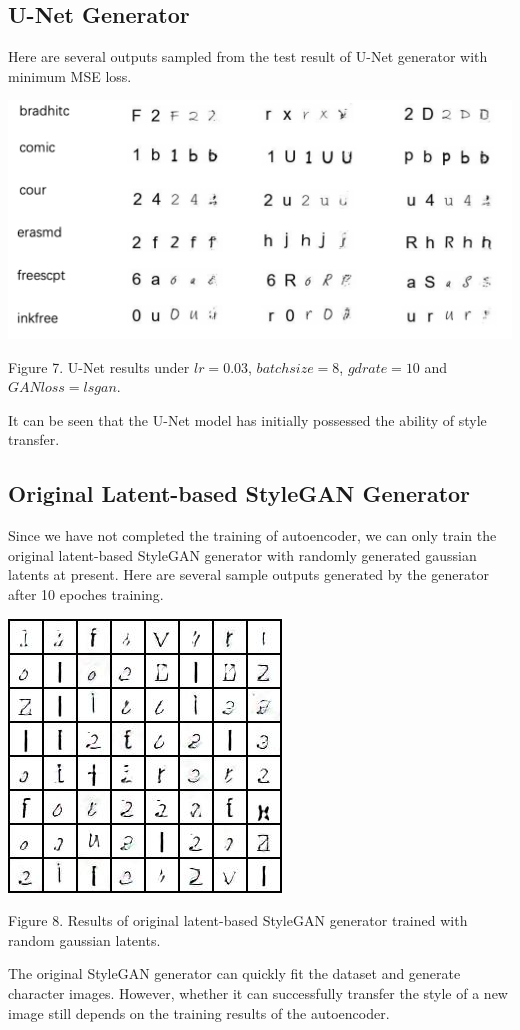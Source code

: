 \documentclass[letterpaper]{article}
\begin{document}
\subsection{U-Net Generator}
Here are several outputs sampled from the test result of U-Net generator with minimum MSE loss. 

\begin{center}
    \includegraphics[width=.5\textwidth]{./update-figs/lr_0.03_batchsize_8_g_d_rate_10_loss_lsgan.png}

    Figure 7. U-Net results under $lr=0.03$, $batchsize=8$, $gdrate=10$ and $GAN loss=lsgan$.
\end{center}

It can be seen that the U-Net model has initially possessed the ability of style transfer.

\subsection{Original Latent-based StyleGAN Generator}
Since we have not completed the training of autoencoder, we can only train the original latent-based StyleGAN generator with randomly generated gaussian latents at present. Here are several sample outputs generated by  the generator after 10 epoches training.

\begin{center}
    \includegraphics[width=.3\textwidth]{./update-figs/latentstylegan.jpg}

    Figure 8. Results of original latent-based StyleGAN generator trained with random gaussian latents.
\end{center}

The original StyleGAN generator can quickly fit the dataset and generate character images. However, whether it can successfully transfer the style of a new image still depends on the training results of the autoencoder.
\end{document}
